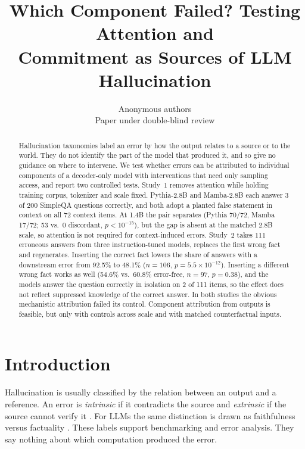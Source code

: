 \documentclass[10pt]{article}
\title{Which Component Failed? Testing Attention and\\ Commitment as Sources of LLM Hallucination}
\author{\name Anonymous authors \\
      \addr Paper under double-blind review}
\begin{document}
\maketitle

\begin{abstract}
Hallucination taxonomies label an error by how the output relates to a source or to the world. They do not identify the part of the model that produced it, and so give no guidance on where to intervene. We test whether errors can be attributed to individual components of a decoder-only model with interventions that need only sampling access, and report two controlled tests. Study~1 removes attention while holding training corpus, tokenizer and scale fixed. Pythia-2.8B and Mamba-2.8B each answer 3 of 200 SimpleQA questions correctly, and both adopt a planted false statement in context on all 72 context items. At 1.4B the pair separates (Pythia 70/72, Mamba 17/72; 53 vs.\ 0 discordant, $p<10^{-15}$), but the gap is absent at the matched 2.8B scale, so attention is not required for context-induced errors. Study~2 takes 111 erroneous answers from three instruction-tuned models, replaces the first wrong fact and regenerates. Inserting the correct fact lowers the share of answers with a downstream error from 92.5\% to 48.1\% ($n=106$, $p=5.5\times10^{-12}$). Inserting a different wrong fact works as well (54.6\% vs.\ 60.8\% error-free, $n=97$, $p=0.38$), and the models answer the question correctly in isolation on 2 of 111 items, so the effect does not reflect suppressed knowledge of the correct answer. In both studies the obvious mechanistic attribution failed its control. Component attribution from outputs is feasible, but only with controls across scale and with matched counterfactual inputs.
\end{abstract}

\section{Introduction}
\label{sec:intro}

Hallucination is usually classified by the relation between an output and a reference. An error is \emph{intrinsic} if it contradicts the source and \emph{extrinsic} if the source cannot verify it \citep{maynez2020,ji2023}. For LLMs the same distinction is drawn as faithfulness versus factuality \citep{huang2023,alansari2025}. These labels support benchmarking and error analysis. They say nothing about which computation produced the error.
\end{document}
